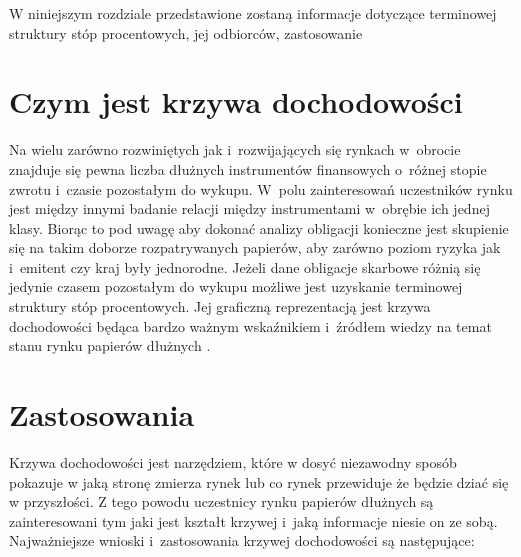 \documentclass[12pt,a4paper,twoside,openany]{book}
\begin{document}
W niniejszym rozdziale przedstawione zostaną informacje dotyczące terminowej struktury stóp procentowych, jej odbiorców, zastosowanie

\section{Czym jest krzywa dochodowości}
\label{sec:krzywa}
Na wielu zarówno rozwiniętych jak i~rozwijających się rynkach w~obrocie znajduje się pewna liczba dłużnych instrumentów finansowych o~różnej stopie zwrotu i~czasie pozostałym do wykupu. W~polu zainteresowań uczestników rynku jest między innymi badanie relacji między instrumentami w~obrębie ich jednej klasy. Biorąc to pod uwagę aby dokonać analizy obligacji konieczne jest skupienie się na takim doborze rozpatrywanych papierów, aby zarówno poziom ryzyka jak i~emitent czy kraj były jednorodne. Jeżeli dane obligacje skarbowe różnią się jedynie czasem pozostałym do wykupu możliwe jest uzyskanie terminowej struktury stóp procentowych. Jej graficzną reprezentacją jest krzywa dochodowości będąca bardzo ważnym wskaźnikiem i~źródłem wiedzy na temat stanu rynku papierów dłużnych \citep{choudhry2004}.

\section{Zastosowania}
\label{sec:zast}
Krzywa dochodowości jest narzędziem, które w dosyć niezawodny sposób pokazuje w jaką stronę zmierza rynek lub co rynek przewiduje że będzie dziać się w przyszłości. Z tego powodu uczestnicy rynku papierów dłużnych są zainteresowani tym jaki jest kształt krzywej i~jaką informacje niesie on ze sobą. Najważniejsze wnioski i~zastosowania krzywej dochodowości są następujące:
\end{document}
